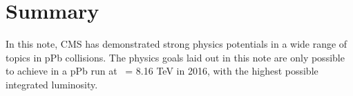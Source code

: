 \section*{Summary}

In this note, CMS has demonstrated strong physics potentials in a wide range of
topics in pPb collisions. The physics goals laid out in this note are only 
possible to achieve in a pPb run at \rootsNN\ = 
8.16 TeV in 2016, with the highest possible integrated luminosity.